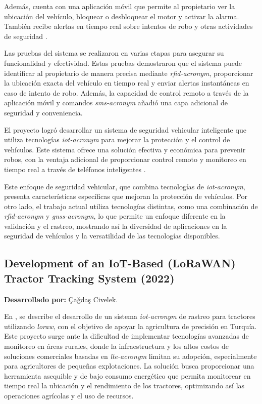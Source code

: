 Además, cuenta con una aplicación móvil que permite al propietario ver la ubicación del vehículo, bloquear o desbloquear el motor y activar la alarma. También recibe alertas en tiempo real sobre intentos de robo y otras actividades de seguridad \cite{Sathiyanarayanan2018}.

Las pruebas del sistema se realizaron en varias etapas para asegurar su funcionalidad y efectividad. Estas pruebas demostraron que el sistema puede identificar al propietario de manera precisa mediante \textit{\acrshort{rfid-acronym}}, proporcionar la ubicación exacta del vehículo en tiempo real y enviar alertas instantáneas en caso de intento de robo. Además, la capacidad de control remoto a través de la aplicación móvil y comandos \textit{\acrshort{sms-acronym}} añadió una capa adicional de seguridad y conveniencia.

El proyecto logró desarrollar un sistema de seguridad vehicular inteligente que utiliza tecnologías \textit{\acrshort{iot-acronym}} para mejorar la protección y el control de vehículos. Este sistema ofrece una solución efectiva y económica para prevenir robos, con la ventaja adicional de proporcionar control remoto y monitoreo en tiempo real a través de teléfonos inteligentes \cite{Sathiyanarayanan2018}.

Este enfoque de seguridad vehicular, que combina tecnologías de \textit{\acrshort{iot-acronym}}, presenta características específicas que mejoran la protección de vehículos. Por otro lado, el trabajo actual utiliza tecnologías distintas, como una combinación de \textit{\acrshort{rfid-acronym}} y \textit{\acrshort{gnss-acronym}}, lo que permite un enfoque diferente en la validación y el rastreo, mostrando así la diversidad de aplicaciones en la seguridad de vehículos y la versatilidad de las tecnologías disponibles.


\subsection{Development of an IoT-Based (LoRaWAN) Tractor Tracking System (2022)}
\textbf{Desarrollado por:} Çağdaş Civelek.

En \cite{Civelek}, se describe el desarrollo de un sistema \textit{\acrshort{iot-acronym}} de rastreo para tractores utilizando \textit{\acrshort{loraw}}, con el objetivo de apoyar la agricultura de precisión en Turquía. Este proyecto surge ante la dificultad de implementar tecnologías avanzadas de monitoreo en áreas rurales, donde la infraestructura y los altos costos de soluciones comerciales basadas en \textit{\acrshort{lte-acronym}} limitan su adopción, especialmente para agricultores de pequeñas explotaciones. La solución busca proporcionar una herramienta asequible y de bajo consumo energético que permita monitorear en tiempo real la ubicación y el rendimiento de los tractores, optimizando así las operaciones agrícolas y el uso de recursos.

